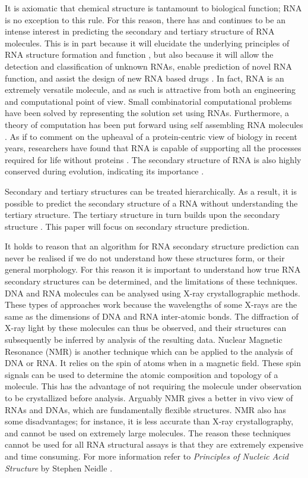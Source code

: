 \documentclass{cshonours}
\begin{document}
It is axiomatic that chemical structure is tantamount to biological function; RNA is no exception to this rule. For this reason, there has and continues to be an intense interest in predicting the secondary and tertiary structure of RNA molecules. This is in part because it will elucidate the underlying principles of RNA structure formation and function \cite{conn1998rna}, but also because it will allow the detection and classification of unknown RNAs, enable prediction of novel RNA function, and assist the design of new RNA based drugs \cite{condon2003problems}. In fact, RNA is an extremely versatile molecule, and as such is attractive from both an engineering and computational point of view. Small combinatorial computational problems have been solved by representing the solution set using RNAs. Furthermore, a theory of computation has been put forward using self assembling RNA molecules \cite{condon2003problems}. As if to comment on the upheaval of a protein-centric view of biology in recent years, researchers have found that RNA is capable of supporting all the processes required for life without proteins \cite{condon2003problems}. The secondary structure of RNA is also highly conserved during evolution, indicating its importance \cite{hofacker2008rna}. 

Secondary and tertiary structures can be treated hierarchically. As a result, it is possible to predict the secondary structure of a RNA without understanding the tertiary structure. The tertiary structure in turn builds upon the secondary structure \cite{tinoco1999rna}. This paper will focus on secondary structure prediction.

It holds to reason that an algorithm for RNA secondary structure prediction can never be realised if we do not understand how these structures form, or their general morphology. For this reason it is important to understand how true RNA secondary structures can be determined, and the limitations of these techniques. DNA and RNA molecules can be analysed using X-ray crystallographic methods. These types of approaches work because the wavelengths of some X-rays are the same as the dimensions of DNA and RNA inter-atomic bonds. The diffraction of X-ray light by these molecules can thus be observed, and their structures can subsequently be inferred by analysis of the resulting data. Nuclear Magnetic Resonance (NMR) is another technique which can be applied to the analysis of DNA or RNA. It relies on the spin of atoms when in a magnetic field. These spin signals can be used to determine the atomic composition and topology of a molecule. This has the advantage of not requiring the molecule under observation to be crystallized before analysis. Arguably NMR gives a better in vivo view of RNAs and DNAs, which are fundamentally flexible structures. NMR also has some disadvantages; for instance, it is less accurate than X-ray crystallography, and cannot be used on extremely large molecules. The reason these techniques cannot be used for all RNA structural assays is that they are extremely expensive and time consuming. For more information refer to \emph{Principles of Nucleic Acid Structure} by Stephen Neidle \cite{neidle2010principles}.
\end{document}
